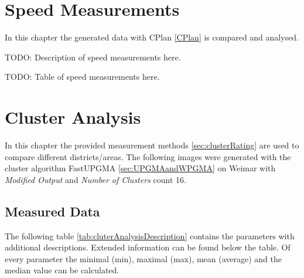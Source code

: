 \section{Speed Measurements} \label{sec:measurements-speed}
In this chapter the generated data with CPlan \ref{CPlan} is compared and analysed.

TODO: Description of speed measurements here. 

TODO: Table of speed measurements here.

\section{Cluster Analysis}
\label{sec:measurements-cluster-analysis}
In this chapter the provided measurement methods \ref{sec:clusterRating} are used to compare different districts/areas. The following images were generated with the cluster algorithm FastUPGMA \ref{sec:UPGMAandWPGMA} on Weimar with \textit{Modified Output} and \textit{Number of Clusters} count 16.

\subsection{Measured Data}
\label{sec:ClusterAnalysisMeasurements}
The following table \ref{tab:cluterAnalysisDescription} contains the parameters with additional descriptions. Extended information can be found below the table. Of every parameter the minimal (min), maximal (max), mean (average) and the median value can be calculated.

